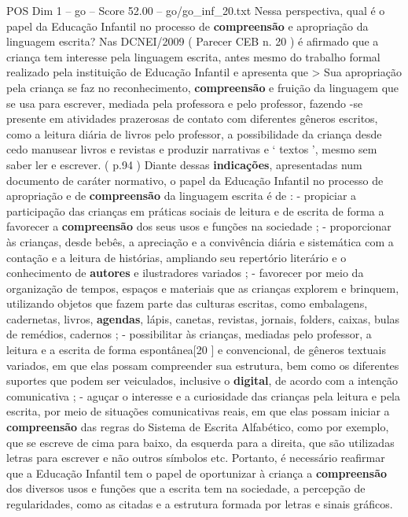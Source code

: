 \begin{textsample}{POS Dim 1 – go – Score 52.00 – go/go\_inf\_20.txt}
Nessa perspectiva, qual é o papel da Educação Infantil no processo de \textbf{compreensão} e apropriação da linguagem escrita?
Nas DCNEI/2009 ( Parecer CEB n. 20 ) é afirmado que a criança tem interesse pela linguagem escrita, antes mesmo do trabalho formal realizado pela instituição de Educação Infantil e apresenta que > Sua apropriação pela criança se faz no reconhecimento, \textbf{compreensão} e fruição da linguagem que se usa para escrever, mediada pela professora e pelo professor, fazendo -se presente em atividades prazerosas de contato com diferentes gêneros escritos, como a leitura diária de livros pelo professor, a possibilidade da criança desde cedo manusear livros e revistas e produzir narrativas e ‘ textos ’, mesmo sem saber ler e escrever. ( p.94 ) Diante dessas \textbf{indicações}, apresentadas num documento de caráter normativo, o papel da Educação Infantil no processo de apropriação e de \textbf{compreensão} da linguagem escrita é de : - propiciar a participação das crianças em práticas sociais de leitura e de escrita de forma a favorecer a \textbf{compreensão} dos seus usos e funções na sociedade ; - proporcionar às crianças, desde bebês, a apreciação e a convivência diária e sistemática com a contação e a leitura de histórias, ampliando seu repertório literário e o conhecimento de \textbf{autores} e ilustradores variados ; - favorecer por meio da organização de tempos, espaços e materiais que as crianças explorem e brinquem, utilizando objetos que fazem parte das culturas escritas, como embalagens, cadernetas, livros, \textbf{agendas}, lápis, canetas, revistas, jornais, folders, caixas, bulas de remédios, cadernos ; - possibilitar às crianças, mediadas pelo professor, a leitura e a escrita de forma espontânea[20 ] e convencional, de gêneros textuais variados, em que elas possam compreender sua estrutura, bem como os diferentes suportes que podem ser veiculados, inclusive o \textbf{digital}, de acordo com a intenção comunicativa ; - aguçar o interesse e a curiosidade das crianças pela leitura e pela escrita, por meio de situações comunicativas reais, em que elas possam iniciar a \textbf{compreensão} das regras do Sistema de Escrita Alfabético, como por exemplo, que se escreve de cima para baixo, da esquerda para a direita, que são utilizadas letras para escrever e não outros símbolos etc.
Portanto, é necessário reafirmar que a Educação Infantil tem o papel de oportunizar à criança a \textbf{compreensão} dos diversos usos e funções que a escrita tem na sociedade, a percepção de regularidades, como as citadas e a estrutura formada por letras e sinais gráficos.

\end{textsample}
